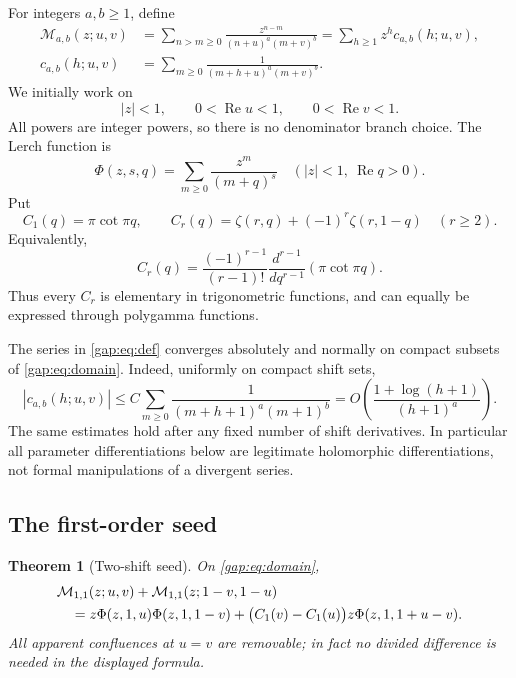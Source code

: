 \documentclass[11pt,letterpaper]{article}
\numberwithin{equation}{section}
\theoremstyle{plain}
\newtheorem{theorem}{Theorem}[section]
\theoremstyle{definition}
\theoremstyle{remark}
\begin{document}
For integers $a,b\geq1$, define
\begin{equation}\label{gap:eq:def}
 \begin{aligned}
 \mathcal M_{a,b}(z;u,v)
 &=\sum_{n>m\geq0}
   \frac{z^{n-m}}{(n+u)^a(m+v)^b}
 =\sum_{h\geq1}z^h c_{a,b}(h;u,v),\\
 c_{a,b}(h;u,v)&=\sum_{m\geq0}
       \frac1{(m+h+u)^a(m+v)^b}.
 \end{aligned}
\end{equation}
We initially work on
\begin{equation}\label{gap:eq:domain}
 |z|<1,\qquad 0<\operatorname{Re}u<1,
 \qquad 0<\operatorname{Re}v<1.
\end{equation}
All powers are integer powers, so there is no denominator branch
choice. The Lerch function is
\[
 \Phi(z,s,q)=\sum_{m\geq0}\frac{z^m}{(m+q)^s}
 \quad (|z|<1,\ \operatorname{Re}q>0).
\]
Put
\begin{equation}\label{gap:eq:C}
 C_1(q)=\pi\cot\pi q,
 \qquad
 C_r(q)=\zeta(r,q)+(-1)^r\zeta(r,1-q)\quad(r\geq2).
\end{equation}
Equivalently,
\begin{equation}\label{gap:eq:Cderivative}
 C_r(q)=\frac{(-1)^{r-1}}{(r-1)!}
          \frac{d^{r-1}}{dq^{r-1}}(\pi\cot\pi q).
\end{equation}
Thus every $C_r$ is elementary in trigonometric functions, and can
equally be expressed through polygamma functions.

The series in \eqref{gap:eq:def} converges absolutely and normally on
compact subsets of \eqref{gap:eq:domain}. Indeed, uniformly on compact
shift sets,
\[
 |c_{a,b}(h;u,v)|\leq
 C\sum_{m\geq0}\frac1{(m+h+1)^a(m+1)^b}
 =O\left(\frac{1+\log(h+1)}{(h+1)^a}\right).
\]
The same estimates hold after any fixed number of shift derivatives.
In particular all parameter differentiations below are legitimate
holomorphic differentiations, not formal manipulations of a divergent
series.

\subsection{The first-order seed}

\begin{theorem}[Two-shift seed]\label{gap:thm:seed}
On \eqref{gap:eq:domain},
\begin{align}
 &\mathcal M_{1,1}(z;u,v)
   +\mathcal M_{1,1}(z;1-v,1-u)\notag\\
 &\quad=z\Phi(z,1,u)\Phi(z,1,1-v)
   +\bigl(C_1(v)-C_1(u)\bigr)
       z\Phi(z,1,1+u-v).
 \label{gap:eq:seed}
\end{align}
All apparent confluences at $u=v$ are removable; in fact no divided
difference is needed in the displayed formula.
\end{theorem}
\end{document}
